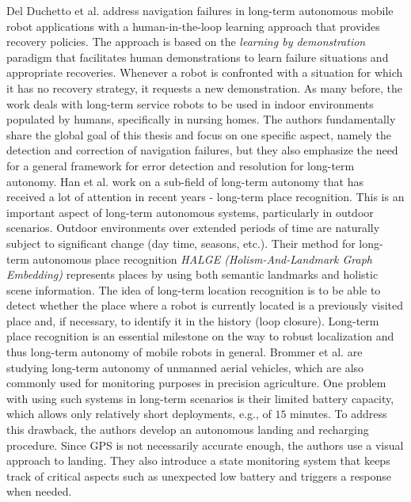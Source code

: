 \documentclass[english, master, utf8]{base/thesis_KBS}
\begin{document}
Del Duchetto et al. \cite{DelDuchetto:2018} address navigation failures in long-term autonomous mobile robot applications with a human-in-the-loop learning approach that provides
recovery policies. The approach is based on the \textit{learning by demonstration} paradigm that facilitates human demonstrations to learn failure situations and appropriate recoveries.
Whenever a robot is confronted with a situation for which it has no recovery strategy, it requests a new demonstration. As many before, the work deals with long-term service robots to be used
in indoor environments populated by humans, specifically in nursing homes. The authors fundamentally share the global goal of this thesis and focus on one specific aspect, namely the
detection and correction of navigation failures, but they also emphasize the need for a general framework for error detection and resolution for long-term autonomy.\newline
Han et al. \cite{Han:2018} work on a sub-field of long-term autonomy that has received a lot of attention in recent years - long-term place recognition. This is an important aspect
of long-term autonomous systems, particularly in outdoor scenarios. Outdoor environments over extended periods of time are naturally subject to significant change (day time,
seasons, etc.). \cite{Han:2018} Their method for long-term autonomous place recognition \textit{HALGE (Holism-And-Landmark Graph Embedding)} represents places by using both semantic
landmarks and holistic scene information. The idea of long-term location recognition is to be able to detect whether the place where a robot is currently located is a
previously visited place and, if necessary, to identify it in the history (loop closure). \cite{Han:2018} Long-term place recognition is an essential milestone on the way to robust
localization and thus long-term autonomy of mobile robots in general.\newline
Brommer et al. \cite{Brommer:2018} are studying long-term autonomy of unmanned aerial vehicles, which are also commonly used for monitoring purposes in precision agriculture. One problem with using such
systems in long-term scenarios is their limited battery capacity, which allows only relatively short deployments, e.g., of $15$ minutes. \cite{Brommer:2018}
To address this drawback, the authors develop an autonomous landing and recharging procedure. Since GPS is not necessarily accurate enough, the authors use a visual approach to
landing. They also introduce a state monitoring system that keeps track of critical aspects such as unexpected low battery and triggers a response when needed.\newline
\end{document}
